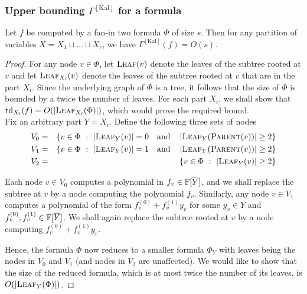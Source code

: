 \documentclass{birkjour}
\newcommand{\CM}[1]{\Gamma^{\mathrm{[#1]}}}
\providecommand{\DIFaddtex}[1]{{\protect\color{blue}\uwave{#1}}} %
\providecommand{\DIFdeltex}[1]{{\protect\color{red}\sout{#1}}}                      %
\providecommand{\DIFaddbegin}{} %
\providecommand{\DIFaddend}{} %
\providecommand{\DIFdelbegin}{} %
\providecommand{\DIFdelend}{} %
\providecommand{\DIFadd}[1]{\texorpdfstring{\DIFaddtex{#1}}{#1}} %
\providecommand{\DIFdel}[1]{\texorpdfstring{\DIFdeltex{#1}}{}} %
\begin{document}
\subsubsection{Upper bounding $\CM{Kal}$ for a formula}

\begin{lemma}\label{lem:kal-upperbound}
  Let $f$ be computed by a fan-in two formula $\Phi$ of size $s$. Then
  for any partition of variables $X = X_1\sqcup \dots \sqcup X_r$, we
  have $\CM{Kal}(f) = O(s)$.
\end{lemma}
\begin{proof}
  For any node $v\in \Phi$, let $\textsc{Leaf}(v)$ denote the leaves
  of the subtree rooted at $v$ and let $\textsc{Leaf}_{X_i}(v)$ denote
  the leaves of the subtree rooted at $v$ that are in the part
  $X_i$. Since the underlying graph of $\Phi$ is a tree, it follows
  that the size of $\Phi$ is bounded by a twice the number of
  leaves. For each part $X_i$, we shall show that
  $\mathrm{td}_{X_i}(f) = O(\left|\textsc{Leaf}_{X_i}(\Phi)\right|)$, which
  would prove the required bound. \\

  Fix an arbitrary part $Y = X_i$. Define the following three 
  sets of nodes
  \begin{eqnarray*}
    V_0 & = & \left\{{v\in \Phi}\ : \ {\left|\textsc{Leaf}_{Y}(v)\right| = 0 \quad\text{and}\quad \left|\textsc{Leaf}_{Y}(\textsc{Parent}(v))\right| \geq 2}\right\}\\
    V_1 & = & \left\{{v\in \Phi}\ : \ {\left|\textsc{Leaf}_{Y}(v)\right| = 1 \quad\text{and}\quad \left|\textsc{Leaf}_{Y}(\textsc{Parent}(v))\right| \geq 2}\right\}\\
    V_2 & = & \left\{{v\in \Phi}\ : \ {\left|\textsc{Leaf}_{Y}(v)\right| \geq 2}\right\}
  \end{eqnarray*}

  Each node $v\in V_0$ computes a polynomial in \DIFdelbegin \DIFdel{$f_v \in
  \mathbb{F}[\overline{Y}]$}\DIFdelend \DIFaddbegin \DIFadd{$f_v \in
  \F[X\setminus Y]$}\DIFaddend , and we shall replace the subtree at $v$ by a node
  computing the polynomial $f_v$. Similarly, any node $v\in V_1$
  computes a polynomial of the form $f^{(0)}_v + f^{(1)}_v y_v$ for some $y_v\in Y$
  and \DIFdelbegin \DIFdel{$f^{(0)}_v, f^{(1)}_v \in \mathbb{F}[\overline{Y}]$}\DIFdelend \DIFaddbegin \DIFadd{$f^{(0)}_v, f^{(1)}_v \in \F[X\setminus Y]$}\DIFaddend . We shall again replace the
  subtree rooted at $v$ by a node computing $f^{(0)}_v + f^{(1)}_v y_v$. 

  Hence, the formula $\Phi$ now reduces to a smaller formula $\Phi_Y$ with
  leaves  being the nodes in $V_0$ and $V_1$ (and nodes in $V_2$ are
  unaffected). We would like to show that the size of the reduced
  formula, which is at most twice the number of its leaves, is
  $O(\left|\textsc{Leaf}_Y(\Phi)\right|)$.


\end{proof}
\end{document}
